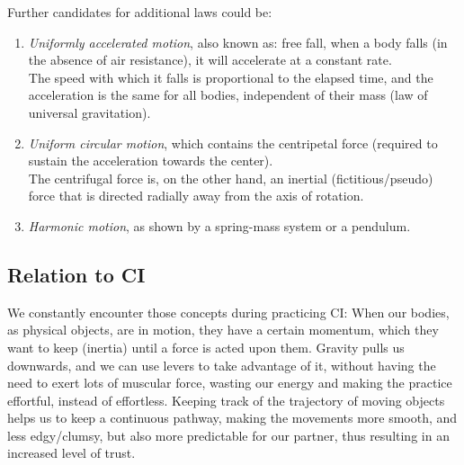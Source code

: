 Further candidates for additional laws could be:
\begin{enumerate}
    \item \textit{Uniformly accelerated motion}, also known as: free fall, when a body falls (in the absence of air resistance), it will accelerate at a constant rate. \\
    The speed with which it falls is proportional to the elapsed time, and the acceleration is the same for all bodies, independent of their mass (law of universal gravitation).
    \item \textit{Uniform circular motion}, which contains the centripetal force (required to sustain the acceleration towards the center). \\
    The centrifugal force is, on the other hand, an inertial (fictitious/pseudo) force that is directed radially away from the axis of rotation.
    \item \textit{Harmonic motion}, as shown by a spring-mass system or a pendulum.
\end{enumerate}

\subsection{Relation to CI}\label{subsec:relation-to-ci}

We constantly encounter those concepts during practicing CI: When our bodies, as physical objects, are in motion, they have a certain momentum, which they want to keep (inertia) until a force is acted upon them.
Gravity pulls us downwards, and we can use levers to take advantage of it, without having the need to exert lots of muscular force, wasting our energy and making the practice effortful, instead of effortless.
Keeping track of the trajectory of moving objects helps us to keep a continuous pathway, making the movements more smooth, and less edgy/clumsy, but also more predictable for our partner, thus resulting in an increased level of trust.
